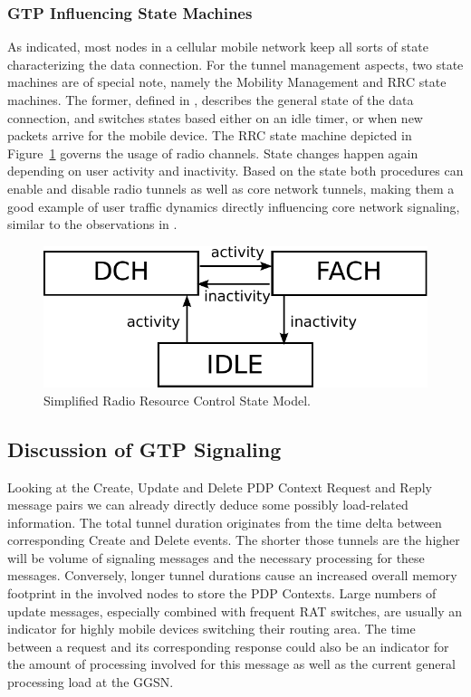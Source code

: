 \subsubsection{GTP Influencing State Machines}

As indicated, most nodes in a cellular mobile network keep all sorts of state characterizing the data connection. For the tunnel management aspects, two state machines are of special note, namely the Mobility Management and RRC state machines.
The former, defined in \cite{3gpp23060}, describes the general state of the data connection, and switches states based either on an idle timer, or when new packets arrive for the mobile device. The \ac{RRC} state machine depicted in Figure~\ref{fig:rrcstatemodel} governs the usage of radio channels. State changes happen again depending on user activity and inactivity.
Based on the state both procedures can enable and disable radio tunnels as well as core network tunnels, making them a good example of user traffic dynamics directly influencing core network signaling, similar to the observations in \cite{lee2007detection}.

\begin{figure}
	\centering
	\includegraphics[width=0.8\columnwidth]{images/IMC2013/rrc-simplified-state-model.pdf}
	\caption{Simplified Radio Resource Control State Model.}
	\label{fig:rrcstatemodel}
\end{figure}


\subsection{Discussion of GTP Signaling}

Looking at the Create, Update and Delete PDP Context Request and Reply message pairs we can already directly deduce some possibly load-related information. The total tunnel duration originates from the time delta between corresponding Create and Delete events. The shorter those tunnels are the higher will be volume of signaling messages and the necessary processing for these messages. Conversely, longer tunnel durations cause an increased overall memory footprint in the involved nodes to store the \ac{PDP} Contexts. Large numbers of update messages, especially combined with frequent \ac{RAT} switches, are usually an indicator for highly mobile devices switching their routing area. 
The time between a request and its corresponding response could also be an indicator for the amount of processing involved for this message as well as the current general processing load at the \ac{GGSN}.

